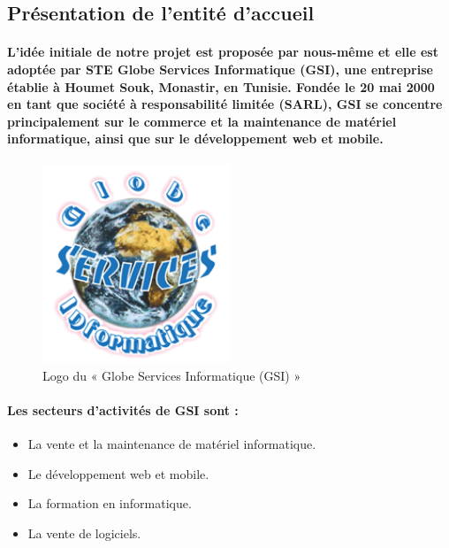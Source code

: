 \subsection{Présentation de l'entité d'accueil}
\paragraph{L'idée initiale de notre projet est proposée par nous-même et elle est adoptée par STE Globe Services Informatique (GSI), une entreprise établie à Houmet Souk, Monastir, en Tunisie. Fondée le 20 mai 2000 en tant que société à responsabilité limitée (SARL), GSI se concentre principalement sur le commerce et la maintenance de matériel informatique, ainsi que sur le développement web et mobile.}
\begin{figure}[ht]
    \centering
    \includegraphics[width=0.5\textwidth]{images/gsi-logo.png}
    \caption{Logo du « Globe Services Informatique (GSI) »}
    \label{fig:gsi-logo}    
\end{figure}

\paragraph{Les secteurs d'activités de GSI sont :}
\begin{itemize}
    \item La vente et la maintenance de matériel informatique.
    \item Le développement web et mobile.
    \item La formation en informatique.
    \item La vente de logiciels.
\end{itemize}

